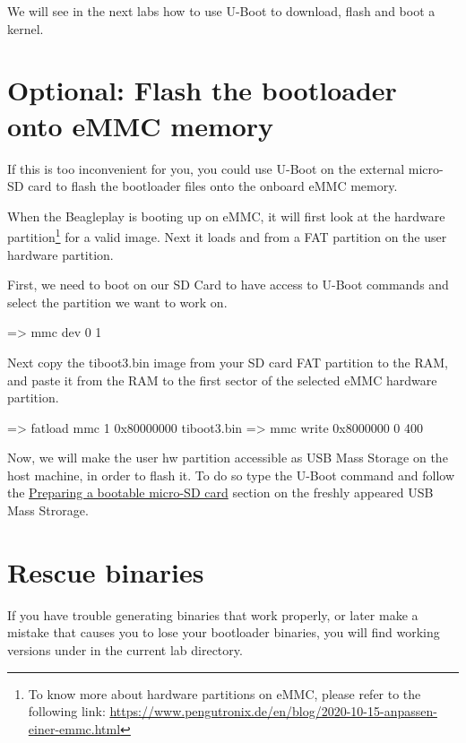 We will see in the next labs how to use U-Boot to download, flash and
boot a kernel.

\section{Optional: Flash the bootloader onto eMMC memory}
If this is too inconvenient for you, you could use U-Boot on the external
micro-SD card to flash the bootloader files onto the onboard eMMC memory.

When the Beagleplay is booting up on eMMC, it will first look at the
 hardware partition\footnote{To know more about hardware partitions
on eMMC, please refer to the following link:
\url{https://www.pengutronix.de/en/blog/2020-10-15-anpassen-einer-emmc.html}}
for a valid  image.
Next it loads  and  from a FAT partition on the
user hardware partition.

First, we need to boot on our SD Card to have access to U-Boot commands and
select the  partition we want to work on.

\begin{ubootinput}
  => mmc dev 0 1
\end{ubootinput}

Next copy the tiboot3.bin image from your SD card FAT partition to the RAM,
and paste it from the RAM to the first sector of the selected eMMC hardware
partition.

\begin{ubootinput}
  => fatload mmc 1 0x80000000 tiboot3.bin
  => mmc write 0x8000000 0 400
\end{ubootinput}

Now, we will make the user hw partition accessible as USB Mass Storage
on the host machine, in order to flash it. To do so type the
 U-Boot command and follow the 
\hyperref[sec:Prepboot]{Preparing a bootable micro-SD card} section
on the freshly appeared USB Mass Strorage.

\section{Rescue binaries}

If you have trouble generating binaries that work properly, or later
make a mistake that causes you to lose your bootloader binaries, you
will find working versions under  in the current lab
directory.
